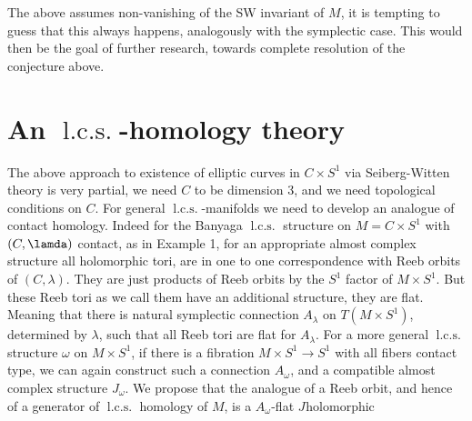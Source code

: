 \documentclass{amsart}
\numberwithin{equation}{section}
\theoremstyle{definition}
\theoremstyle{remark}
\DeclareMathOperator{\lcs}{l.c.s.}
\begin{document}
The above assumes non-vanishing of the SW invariant of $M$, it is tempting to guess that this always happens, analogously with the symplectic case. This would then be the goal of further research, towards complete resolution of the conjecture above. 
\section {An $\lcs$-homology theory} The above approach to existence of elliptic curves in $C \times S ^{1} $ via Seiberg-Witten theory is very partial, we need $C$ to be dimension 3, and we need topological conditions on $C$. For general $\lcs$-manifolds we need to develop an analogue of contact homology. Indeed for the Banyaga $\lcs$ structure on $M=C\times S ^{1} $ with $(C, \lamda)$ contact, as in Example 1, for an appropriate almost complex structure all holomorphic tori, are in one to one correspondence with Reeb orbits of $(C, \lambda)$. They are just products of Reeb orbits by the $S ^{1} $ factor of $M \times S ^{1} $.
But these Reeb tori as we call them have an additional structure, they are flat.
Meaning that there is natural symplectic connection $A _{\lambda} $ on  $T(M \times S ^{1}) $, determined by $\lambda$, such that all Reeb tori are flat for $A _{\lambda} $. For a more general $\lcs$ structure $\omega$ on $M \times S ^{1} $, if there is a fibration $M \times S ^{1} \to S ^{1} $ with all fibers contact type,  we can again construct such a connection $A _{\omega} $, and a compatible almost complex structure $J _{\omega} $.
We propose that the analogue of a Reeb orbit, and hence of a generator of $\lcs$ homology of $M$, is a $A _{\omega} $-flat $J _{} $holomorphic 
  
   
%  
\end{document}
